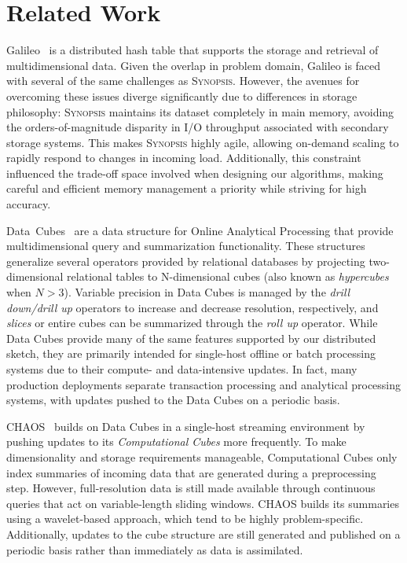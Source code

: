 \section{Related Work}
\label{sec:related}

Galileo~\cite{malensek2016analytic,malensek2015fast} is a distributed hash table that supports the storage and retrieval of multidimensional data. Given the overlap in problem domain, Galileo is faced with several of the same challenges as \textsc{Synopsis}. However, the avenues for overcoming these issues diverge significantly due to differences in storage philosophy: \textsc{Synopsis} maintains its dataset completely in main memory, avoiding the orders-of-magnitude disparity in I/O throughput associated with secondary storage systems. This makes \textsc{Synopsis} highly agile, allowing on-demand scaling to rapidly respond to changes in incoming load. Additionally, this constraint influenced the trade-off space involved when designing our algorithms, making careful and efficient memory management a priority while striving for high accuracy.

Data~Cubes~\cite{gray1996data} are a data structure for Online Analytical Processing that provide multidimensional query and summarization functionality. These structures generalize several operators provided by relational databases by projecting two-dimensional relational tables to N-dimensional cubes (also known as \emph{hypercubes} when $N > 3$). Variable precision in Data Cubes is managed by the \emph{drill down/drill up} operators to increase and decrease resolution, respectively, and \emph{slices} or entire cubes can be summarized through the \emph{roll up} operator. While Data Cubes provide many of the same features supported by our distributed sketch, they are primarily intended for single-host offline or batch processing systems due to their compute- and data-intensive updates. In fact, many production deployments separate transaction processing and analytical processing systems, with updates pushed to the Data Cubes on a periodic basis. 

CHAOS~\cite{gupta2009chaos} builds on Data Cubes in a single-host streaming environment by pushing updates to its \emph{Computational Cubes} more frequently. To make dimensionality and storage requirements manageable, Computational Cubes only index summaries of incoming data that are generated during a preprocessing step. However, full-resolution data is still made available through continuous queries that act on variable-length sliding windows. CHAOS builds its summaries using a wavelet-based approach, which tend to be highly problem-specific. Additionally, updates to the cube structure are still generated and published on a periodic basis rather than immediately as data is assimilated.

